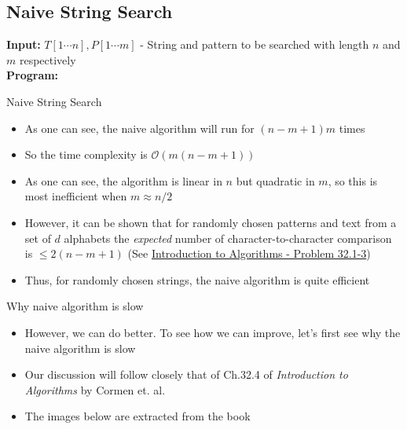 \documentclass[10pt,xcolor={table,dvipsnames},t]{beamer}
\begin{document}
\subsection{Naive String Search}
\begin{frame}[fragile]
  \begin{algorithm}[H]
    \caption{Naive String Search}\label{alg:naive_search}
    \begin{flushleft}
      \textbf{Input:} $T[1\cdots n],P[1\cdots m]$ - String and pattern to be searched with length $n$ and $m$ respectively\\
      \textbf{Program:} 
    \end{flushleft}
    \begin{algorithmic}
        \EndIf
        \EndFor
        \EndIf
      \EndFor
    \end{algorithmic}
  \end{algorithm}
\end{frame}

\begin{frame}{Naive String Search}
  \begin{itemize}
    \item As one can see, the naive algorithm will run for $(n-m+1)m$ times
    \item So the time complexity is $\mathcal{O}(m(n-m+1))$
    \item As one can see, the algorithm is linear in $n$ but quadratic in $m$, so this is most inefficient when $m \approx n/2$
    \item However, it can be shown that for randomly chosen patterns and text from a set of $d$ alphabets the \textit{expected} number of character-to-character comparison is $\leq 2(n-m+1)$ (See \href{https://www.amazon.com/Introduction-Algorithms-3rd-MIT-Press/dp/0262033844}{Introduction to Algorithms - Problem 32.1-3})
    \item Thus, for randomly chosen strings, the naive algorithm is quite efficient
  \end{itemize}
\end{frame}

\begin{frame}{Why naive algorithm is slow}
  \begin{itemize}
    \item However, we can do better. To see how we can improve, let's first see why the naive algorithm is slow
    \item Our discussion will follow closely that of Ch.32.4 of \textit{Introduction to Algorithms} by Cormen et. al.
    \item The images below are extracted from the book
  \end{itemize}
\end{frame}
\end{document}
